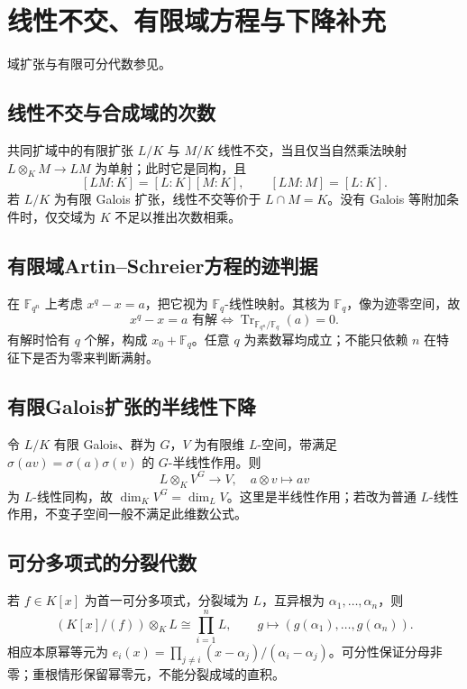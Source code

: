 \documentclass[../main.tex]{subfiles}
\begin{document}
\section{线性不交、有限域方程与下降补充}
域扩张与有限可分代数参见\cite{milneFT}。
\subsection{线性不交与合成域的次数}
共同扩域中的有限扩张 $L/K$ 与 $M/K$ 线性不交，当且仅当自然乘法映射 $L\otimes_KM\to LM$ 为单射；此时它是同构，且
\[
[LM:K]=[L:K][M:K],\qquad [LM:M]=[L:K].
\]
若 $L/K$ 为有限 Galois 扩张，线性不交等价于 $L\cap M=K$。没有 Galois 等附加条件时，仅交域为 $K$ 不足以推出次数相乘。
\subsection{有限域Artin--Schreier方程的迹判据}
在 $\mathbb F_{q^n}$ 上考虑 $x^q-x=a$，把它视为 $\mathbb F_q$-线性映射。其核为 $\mathbb F_q$，像为迹零空间，故
\[
x^q-x=a\text{ 有解}\iff
\operatorname{Tr}_{\mathbb F_{q^n}/\mathbb F_q}(a)=0.
\]
有解时恰有 $q$ 个解，构成 $x_0+\mathbb F_q$。任意 $q$ 为素数幂均成立；不能只依赖 $n$ 在特征下是否为零来判断满射。
\subsection{有限Galois扩张的半线性下降}
令 $L/K$ 有限 Galois、群为 $G$，$V$ 为有限维 $L$-空间，带满足 $\sigma(av)=\sigma(a)\sigma(v)$ 的 $G$-半线性作用。则
\[
L\otimes_KV^G\longrightarrow V,\quad a\otimes v\longmapsto av
\]
为 $L$-线性同构，故 $\dim_KV^G=\dim_LV$。这里是半线性作用；若改为普通 $L$-线性作用，不变子空间一般不满足此维数公式。
\subsection{可分多项式的分裂代数}
若 $f\in K[x]$ 为首一可分多项式，分裂域为 $L$，互异根为 $\alpha_1,\ldots,\alpha_n$，则
\[
(K[x]/(f))\otimes_KL\cong\prod_{i=1}^nL,
\qquad g\longmapsto(g(\alpha_1),\ldots,g(\alpha_n)).
\]
相应本原幂等元为 $e_i(x)=\prod_{j\ne i}(x-\alpha_j)/(\alpha_i-\alpha_j)$。可分性保证分母非零；重根情形保留幂零元，不能分裂成域的直积。
\clearpage
\end{document}
